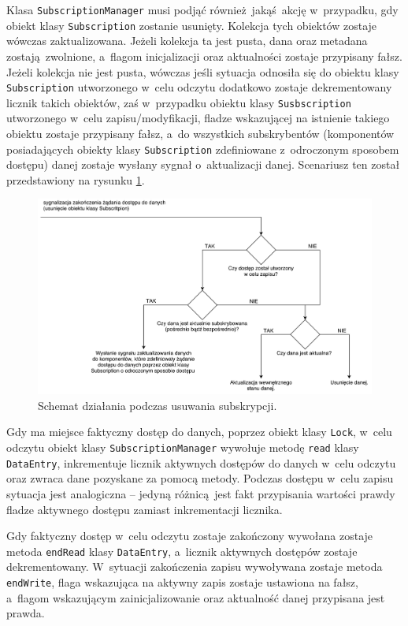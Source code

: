 Klasa \lstinline$SubscriptionManager$ musi podjąć również jakąś akcję w~przypadku, gdy obiekt klasy \lstinline$Subscription$ zostanie usunięty. Kolekcja tych obiektów zostaje wówczas zaktualizowana. Jeżeli kolekcja ta jest pusta, dana oraz metadana zostają zwolnione, a~flagom inicjalizacji oraz aktualności zostaje przypisany fałsz.
Jeżeli kolekcja nie jest pusta, wówczas jeśli sytuacja odnosiła się do obiektu klasy \lstinline$Subscription$ utworzonego w~celu odczytu dodatkowo zostaje dekrementowany licznik takich obiektów, zaś w~przypadku obiektu klasy \lstinline$Susbscription$ utworzonego w~celu zapisu/modyfikacji, fladze wskazującej na istnienie takiego obiektu zostaje przypisany fałsz, a~do wszystkich subskrybentów (komponentów posiadających obiekty klasy \lstinline$Subscription$ zdefiniowane z~odroczonym sposobem dostępu) danej zostaje wysłany sygnał o~aktualizacji danej. Scenariusz ten został przedstawiony na rysunku \ref{fig:unsubscribe}.

\begin{figure}[ht]
	\centering
	\includegraphics[width=1\linewidth]{rys05/unsubscribe}
	\caption{Schemat działania podczas usuwania subskrypcji.}
	\label{fig:unsubscribe}	
\end{figure}

Gdy ma miejsce faktyczny dostęp do danych, poprzez obiekt klasy \lstinline$Lock$, w~celu odczytu obiekt klasy \lstinline$SubscriptionManager$ wywołuje metodę \lstinline$read$ klasy \lstinline$DataEntry$, inkrementuje licznik aktywnych dostępów do danych w~celu odczytu oraz zwraca dane pozyskane za pomocą metody. Podczas dostępu w~celu zapisu sytuacja jest analogiczna -- jedyną różnicą jest fakt przypisania wartości prawdy fladze aktywnego dostępu zamiast inkrementacji licznika. 

Gdy faktyczny dostęp w~celu odczytu zostaje zakończony wywołana zostaje metoda \lstinline$endRead$ klasy \lstinline$DataEntry$, a~licznik aktywnych dostępów zostaje dekrementowany. W~sytuacji zakończenia zapisu wywoływana zostaje metoda \lstinline$endWrite$, flaga wskazująca na aktywny zapis zostaje ustawiona na fałsz, a~flagom wskazującym zainicjalizowanie oraz aktualność danej przypisana jest prawda.

